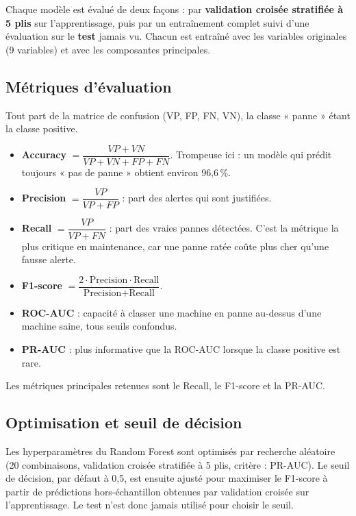 \documentclass[12pt,a4paper]{article}
\begin{document}
Chaque modèle est évalué de deux façons : par \textbf{validation croisée stratifiée à 5 plis} sur l'apprentissage, puis par un entraînement complet suivi d'une évaluation sur le \textbf{test} jamais vu. Chacun est entraîné avec les variables originales (9 variables) et avec les composantes principales.

\subsection{Métriques d'évaluation}
Tout part de la matrice de confusion (VP, FP, FN, VN), la classe « panne » étant la classe positive.

\begin{itemize}[noitemsep]
  \item \textbf{Accuracy} $= \dfrac{VP + VN}{VP + VN + FP + FN}$. Trompeuse ici : un modèle qui prédit toujours « pas de panne » obtient environ 96,6\,\%.
  \item \textbf{Precision} $= \dfrac{VP}{VP + FP}$ : part des alertes qui sont justifiées.
  
  \item \textbf{Recall} $= \dfrac{VP}{VP + FN}$ : part des vraies pannes détectées. C'est la métrique la plus critique en maintenance, car une panne ratée coûte plus cher qu'une fausse alerte.
  \item \textbf{F1-score} $= \dfrac{2\cdot \text{Precision}\cdot \text{Recall}}{\text{Precision} + \text{Recall}}$.
  \item \textbf{ROC-AUC} : capacité à classer une machine en panne au-dessus d'une machine saine, tous seuils confondus.
  \item \textbf{PR-AUC} : plus informative que la ROC-AUC lorsque la classe positive est rare.
\end{itemize}
Les métriques principales retenues sont le Recall, le F1-score et la PR-AUC.

\subsection{Optimisation et seuil de décision}
Les hyperparamètres du Random Forest sont optimisés par recherche aléatoire (20 combinaisons, validation croisée stratifiée à 5 plis, critère : PR-AUC). Le seuil de décision, par défaut à 0,5, est ensuite ajusté pour maximiser le F1-score à partir de prédictions hors-échantillon obtenues par validation croisée sur l'apprentissage. Le test n'est donc jamais utilisé pour choisir le seuil.
\end{document}
